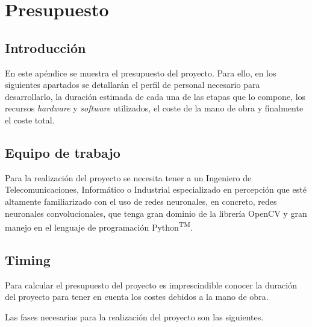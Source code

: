 
\chapter{Presupuesto}
\label{cha:presupuesto}

\section{Introducción}
\label{sec:intro-presupuesto}

En este apéndice se muestra el presupuesto del proyecto. Para ello, en los siguientes apartados se detallarán el perfil de personal necesario para desarrollarlo, la duración estimada de cada una de las etapas que lo compone, los recursos \textit{hardware} y \textit{software} utilizados, el coste de la mano de obra y finalmente el coste total.

\section{Equipo de trabajo}
\label{sec:equipo-presupuesto}

Para la realización del proyecto se necesita tener a un Ingeniero de Telecomunicaciones, Informático o Industrial especializado en percepción que esté altamente familiarizado con el uso de redes neuronales, en concreto, redes neuronales convolucionales, que tenga gran dominio de la librería OpenCV y gran manejo en el lenguaje de programación Python\textsuperscript{TM}.

\section{Timing}
\label{sec:timing-presupuesto}

Para calcular el presupuesto del proyecto es imprescindible conocer la duración del proyecto para tener en cuenta los costes debidos a la mano de obra.

Las fases necesarias para la realización del proyecto son las siguientes.

